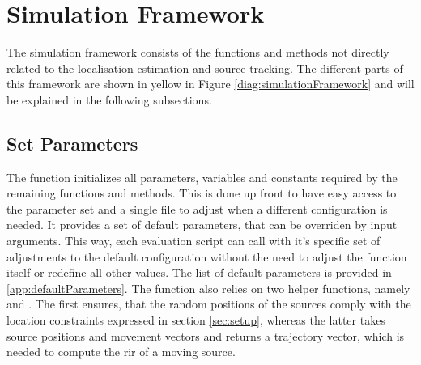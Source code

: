 \section{Simulation Framework}
%	

The simulation framework consists of the functions and methods not directly related to the localisation estimation and source tracking. The different parts of this framework are shown in yellow in Figure \ref{diag:simulationFramework} and will be explained in the following subsections.

\subsection{Set Parameters}
The  function initializes all parameters, variables and constants required by the remaining functions and methods. This is done up front to have easy access to the parameter set and a single file to adjust when a different configuration is needed. It provides a set of default parameters, that can be overriden by input arguments. This way, each evaluation script can call  with it's specific set of adjustments to the default configuration without the need to adjust the function itself or redefine all other values. The list of default parameters is provided in \ref{app:defaultParameters}.
The function also relies on two helper functions, namely  and . The first ensures, that the random positions of the sources comply with the location constraints expressed in section \ref{sec:setup}, whereas the latter takes source positions and movement vectors and returns a trajectory vector, which is needed to compute the \gls{rir} of a moving source.


